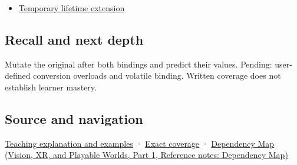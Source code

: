 \hypertarget{appendix-37856d997bb0-used-by}{}

\begin{itemize}
\tightlist
\item
  \hyperref[appendix-a978b29bbbb0]{Temporary lifetime extension}
\end{itemize}

\subsection{Recall and next depth}\label{appendix-37856d997bb0-recall-and-next-depth}

\hypertarget{appendix-37856d997bb0-recall-and-next-depth}{}

Mutate the original after both bindings and predict their values. Pending: user-defined conversion overloads and volatile binding. Written coverage does not establish learner mastery.

\subsection{Source and navigation}\label{appendix-37856d997bb0-source-and-navigation}

\hypertarget{appendix-37856d997bb0-source-and-navigation}{}

\hyperref[01-foundations-i-ch003-binding-chooses-a-referent-not-always-the-one-you-imagined]{Teaching explanation and examples} · \hyperref[appendix-fd090d982a15-m008---parts-113-126]{Exact coverage} · \href{../07-Vision-XR-and-Playable-Worlds-P01/main.pdf\#appendix-4ad47bdd269a}{Dependency Map (Vision, XR, and Playable Worlds, Part 1, Reference notes: Dependency Map)}
